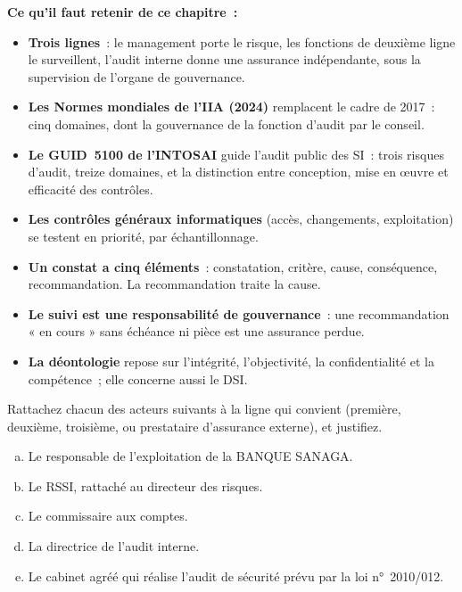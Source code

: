 \separateur

\begin{boxresume}
\textbf{Ce qu'il faut retenir de ce chapitre~:}
\begin{itemize}
    \item \textbf{Trois lignes}~: le management porte le risque, les
          fonctions de deuxième ligne le surveillent, l'audit interne donne
          une assurance indépendante, sous la supervision de l'organe de
          gouvernance.
    \item \textbf{Les Normes mondiales de l'IIA (2024)} remplacent le cadre
          de 2017~: cinq domaines, dont la gouvernance de la fonction d'audit
          par le conseil.
    \item \textbf{Le GUID~5100 de l'INTOSAI} guide l'audit public des SI~:
          trois risques d'audit, treize domaines, et la distinction entre
          conception, mise en œuvre et efficacité des contrôles.
    \item \textbf{Les contrôles généraux informatiques} (accès,
          changements, exploitation) se testent en priorité, par
          échantillonnage.
    \item \textbf{Un constat a cinq éléments}~: constatation, critère,
          cause, conséquence, recommandation. La recommandation traite la
          cause.
    \item \textbf{Le suivi est une responsabilité de gouvernance}~: une
          recommandation « en cours » sans échéance ni pièce est une
          assurance perdue.
    \item \textbf{La déontologie} repose sur l'intégrité, l'objectivité, la
          confidentialité et la compétence~; elle concerne aussi le DSI.
\end{itemize}
\end{boxresume}

\bigskip

\begin{boxexo}[title={\ding{45}\quad Exercice~11.1. Quelle ligne~? \niveaubase}]
Rattachez chacun des acteurs suivants à la ligne qui convient (première,
deuxième, troisième, ou prestataire d'assurance externe), et justifiez.
\begin{enumerate}[(a)]
    \item Le responsable de l'exploitation de la BANQUE SANAGA.
    \item Le RSSI, rattaché au directeur des risques.
    \item Le commissaire aux comptes.
    \item La directrice de l'audit interne.
    \item Le cabinet agréé qui réalise l'audit de sécurité prévu par la loi
          n°~2010/012.
\end{enumerate}
\end{boxexo}

